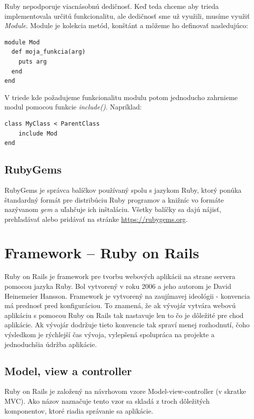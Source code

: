 Ruby nepodporuje viacnásobnú dedičnosť. Keď teda chceme aby trieda implementovala určitú funkcionalitu, ale dedičnosť sme už využili, musíme využiť \emph{Module}. Module je kolekcia metód, konštánt a môžeme ho definovať nasledujúco:

\begin{verbatim}
module Mod
  def moja_funkcia(arg)
    puts arg
  end
end
\end{verbatim}

V triede kde požadujeme funkcionalitu modulu potom jednoducho zahrnieme modul pomocou funkcie \emph{include()}. Napríklad:

\begin{verbatim}
class MyClass < ParentClass
    include Mod
end
\end{verbatim}

\subsection{RubyGems}

RubyGems je správca balíčkov používaný spolu s jazykom Ruby, ktorý ponúka štandardný formát pre distribúciu Ruby programov a knižníc vo formáte nazývanom \emph{gem} a uľahčuje ich inštaláciu. Všetky balíčky sa dajú nájisť, prehľadávať alebo pridávať na stránke \url{https://rubygems.org}.

\section{Framework -- Ruby on Rails}

Ruby on Rails je framework pre tvorbu webových aplikácii na strane servera pomocou jazyka Ruby. Bol vytvorený v roku 2006 a jeho autorom je David Heinemeier Hansson. Framework je vytvorený na zaujímavej ideológii - konvencia má prednosť pred konfiguráciou. To znamená, že ak vývojár vytvára webovú aplikáciu s pomocou Ruby on Rails tak nastavuje len to čo je dôležité pre chod aplikácie.
Ak vývojár dodržuje tieto konvencie tak spraví menej rozhodnutí, čoho výsledkom je rýchlejší čas vývoja, vylepšená spolupráca na projekte a jednoduchšia údržba aplikácie.

\subsection{Model, view a controller}

Ruby on Rails je založený na návrhovom vzore Model-view-controller (v skratke MVC). Ako názov naznačuje tento vzor sa skladá z troch dôležitých komponentov, ktoré riadia správanie sa aplikácie.

